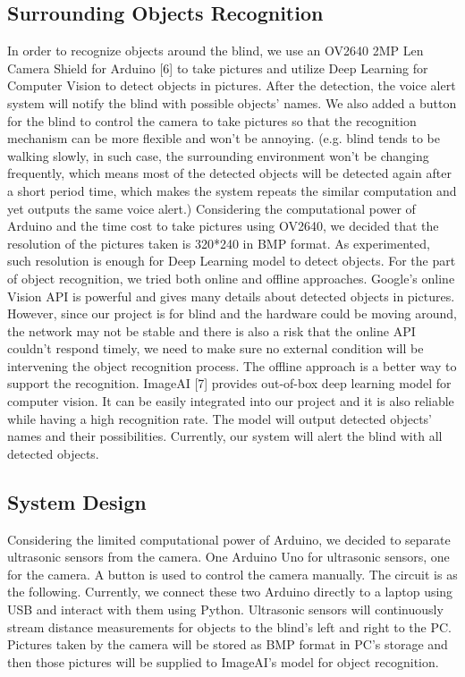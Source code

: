 \subsection{Surrounding Objects Recognition}
In order to recognize objects around the blind, we use an OV2640 2MP Len Camera Shield for Arduino [6] to take pictures and utilize Deep Learning for Computer Vision to detect objects in pictures. After the detection, the voice alert system will notify the blind with possible objects’ names. We also added a button for the blind to control the camera to take pictures so that the recognition mechanism can be more flexible and won’t be annoying. (e.g. blind tends to be walking slowly, in such case, the surrounding environment won’t be changing frequently, which means most of the detected objects will be detected again after a short period time, which makes the system repeats the similar computation and yet outputs the same voice alert.)  
\newline \newline
Considering the computational power of Arduino and the time cost to take pictures using OV2640, we decided that the resolution of the pictures taken is 320*240 in BMP format. As experimented, such resolution is enough for Deep Learning model to detect objects. 
\newline \newline
For the part of object recognition, we tried both online and offline approaches. Google’s online Vision API is powerful and gives many details about detected objects in pictures. However, since our project is for blind and the hardware could be moving around, the network may not be stable and there is also a risk that the online API couldn’t respond timely, we need to make sure no external condition will be intervening the object recognition process. The offline approach is a better way to support the recognition. ImageAI [7] provides out-of-box deep learning model for computer vision. It can be easily integrated into our project and it is also reliable while having a high recognition rate. The model will output detected objects’ names and their possibilities. Currently, our system will alert the blind with all detected objects.

\subsection{System Design}
Considering the limited computational power of Arduino, we decided to separate ultrasonic sensors from the camera. One Arduino Uno for ultrasonic sensors, one for the camera. A button is used to control the camera manually. The circuit is as the following. Currently, we connect these two Arduino directly to a laptop using USB and interact with them using Python. 
\newline \newline
Ultrasonic sensors will continuously stream distance measurements for objects to the blind’s left and right to the PC. 
Pictures taken by the camera will be stored as BMP format in PC’s storage and then those pictures will be supplied to ImageAI’s model for object recognition. 

